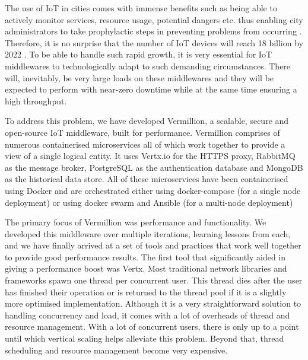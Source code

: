 \documentclass[conference, 10pt]{IEEEtran}
\begin{document}
The use of IoT in cities comes with immense benefits such as being able to actively monitor services, resource usage, potential dangers etc. thus enabling city administrators to take prophylactic steps in preventing problems from occurring \cite{villanueva2013civitas}. Therefore, it is no surprise that the number of IoT devices will reach 18 billion by 2022 \cite{rostanski2014evaluation}. To be able to handle such rapid growth, it is very essential for IoT middlewares to technologically adapt to such demanding circumstances. There will, inevitably, be very large loads on these middlewares and they will be expected to perform with near-zero downtime while at the same time ensuring a high throughput. 

To address this problem, we have developed Vermillion\cite{vermillion}, a scalable, secure and open-source IoT middleware, built for performance.  Vermillion comprises of numerous containerised microservices all of which work together to provide a view of a single logical entity. It uses Vertx.io \cite{vertx} for the HTTPS proxy, RabbitMQ \cite{rabbit} as the message broker, PostgreSQL \cite{postgres} as the authentication database and MongoDB \cite{mongo} as the historical data store. All of these microservices have been containerised using Docker \cite{docker} and are orchestrated either using docker-compose (for a single node deployment) or using docker swarm and Ansible \cite{ansible} (for a multi-node deployment)

The primary focus of Vermillion was performance and functionality. We developed this middleware over multiple iterations, learning lessons from each, and we have finally arrived at a set of tools and practices that work well together to provide good performance results. The first tool that significantly aided in giving a performance boost was Vertx. Most traditional network libraries and frameworks spawn one thread per concurrent user. This thread dies after the user has finished their operation or is returned to the thread pool if it is a slightly more optimised implementation. Although it is a very straightforward solution to handling concurrency and load, it comes with a lot of overheads of thread and resource management. With a lot of concurrent users, there is only up to a point until which vertical scaling helps alleviate this problem. Beyond that, thread scheduling and resource management become very expensive. 
\end{document}
